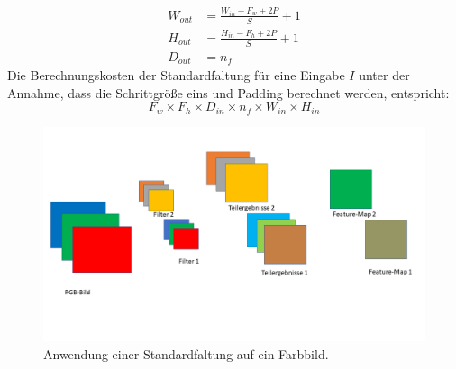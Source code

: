 \documentclass[12pt,a4paper]{scrartcl}
\numberwithin{equation}{section}
\begin{document}
\begin{equation}\label{eq:outputSize}
	 \begin{split}
	W_{out} &= \frac{W_{in}-F_w+2P}{S}+1\\
	H_{out} &= \frac{H_{in}-F_h+2P}{S}+1\\
	D_{out} &= n_f 
	\end{split} 
\end{equation}
Die Berechnungskosten der Standardfaltung für eine Eingabe $ I $ unter der Annahme, dass die Schrittgröße eins und Padding berechnet werden, entspricht:
\begin{equation}\label{eq:SF_kost}
	F_w\times F_h \times D_{in}\times n_f \times W_{in}\times H_{in}
\end{equation}
\begin{figure}[h]
	\includegraphics[width=\textwidth]{Convolution/Folie1}
	\caption{Anwendung einer Standardfaltung auf ein Farbbild.}
	\label{fig:Standardfaltung}
\end{figure}
\end{document}
